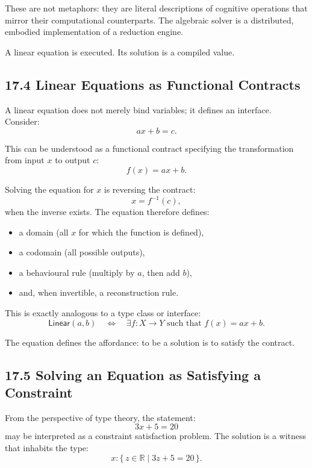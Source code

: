 \documentclass[12pt,letterpaper]{article}
\theoremstyle{remark}
\begin{document}
These are not metaphors: they are literal descriptions of cognitive operations that mirror their computational counterparts. The algebraic solver is a distributed, embodied implementation of a reduction engine.

A linear equation is executed. Its solution is a compiled value.

\subsection{17.4 Linear Equations as Functional Contracts}

A linear equation does not merely bind variables; it defines an interface. Consider:
\[
ax + b = c.
\]

This can be understood as a functional contract specifying the transformation from input \(x\) to output \(c\):
\[
f(x) = ax + b.
\]

Solving the equation for \(x\) is reversing the contract:
\[
x = f^{-1}(c),
\]
when the inverse exists. The equation therefore defines:

\begin{itemize}
    \item a domain (all \(x\) for which the function is defined),
    \item a codomain (all possible outputs),
    \item a behavioural rule (multiply by \(a\), then add \(b\)),
    \item and, when invertible, a reconstruction rule.
\end{itemize}

This is exactly analogous to a type class or interface:
\[
\mathsf{Linear}(a,b) \quad \iff \quad \exists f : X \to Y \text{ such that } f(x) = ax + b.
\]

The equation defines the affordance: to be a solution is to satisfy the contract.

\subsection{17.5 Solving an Equation as Satisfying a Constraint}

From the perspective of type theory, the statement:
\[
3x + 5 = 20
\]
may be interpreted as a constraint satisfaction problem. The solution is a witness that inhabits the type:
\[
x : \{\,z \in \mathbb{R} \mid 3z + 5 = 20\,\}.
\]
\end{document}
